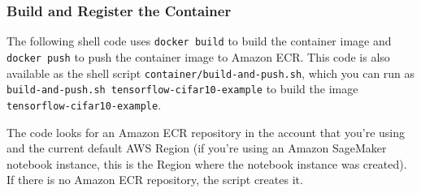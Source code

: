 \documentclass[11pt]{article}
\begin{document}
    \subsubsection{Build and Register the
Container}\label{build-and-register-the-container}

The following shell code uses \texttt{docker\ build} to build the
container image and \texttt{docker\ push} to push the container image to
Amazon ECR. This code is also available as the shell script
\texttt{container/build-and-push.sh}, which you can run as
\texttt{build-and-push.sh\ tensorflow-cifar10-example} to build the
image \texttt{tensorflow-cifar10-example}.

The code looks for an Amazon ECR repository in the account that you're
using and the current default AWS Region (if you're using an Amazon
SageMaker notebook instance, this is the Region where the notebook
instance was created). If there is no Amazon ECR repository, the script
creates it.
\end{document}
